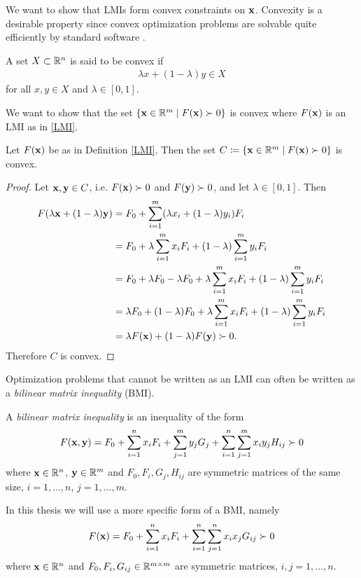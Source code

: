 \documentclass[a4paper,12pt,twoside,BCOR=10mm]{scrbook}
\begin{document}
We want to show that LMIs form convex constraints on $\mathbf{x}$. Convexity is a desirable property since convex optimization problems are solvable quite efficiently by standard software \citep{vABr2000lmibmi}.
\begin{definition}\label{Kýptni}
A set $X \subset \mathbb{R}^{n}$ is said to be convex if
    \begin{align*}
        \lambda x + (1 - \lambda)y \in X
    \end{align*}
for all $x,y\in X$ and $\lambda \in [0,1]$.
\end{definition}
We want to show that the set $\{\mathbf{x}\in\mathbb{R}^{m} \mid F(\mathbf{x}) \succ 0\}$ is convex where $F(\mathbf{x})$ is an LMI as in \eqref{LMI}.
\begin{theorem}\label{KýptniLMI}
Let $F(\mathbf{x})$ be as in Definition \ref{LMI}. Then the set $C \coloneqq \{\mathbf{x}\in\mathbb{R}^{m} \mid F(\mathbf{x}) \succ 0\}$ is convex.
\end{theorem}
\begin{proof}
Let $\mathbf{x}, \mathbf{y} \in C$, i.e. $F(\mathbf{x}) \succ 0$ and $F(\mathbf{y}) \succ 0$, and let $\lambda \in [0,1]$. Then
\begin{align*}
    F(\lambda\mathbf{x} + (1 - \lambda)\mathbf{y}) &= F_0 + \sum\limits_{i = 1}^m (\lambda x_i + (1 - \lambda)y_i)F_i\\
    &= F_0 + \lambda \sum\limits_{i = 1}^m x_i F_i + (1 - \lambda)\sum\limits_{i = 1}^m y_i F_i\\
    &= F_0 + \lambda F_0 - \lambda F_0 + \lambda \sum\limits_{i = 1}^m x_i F_i + (1 - \lambda)\sum\limits_{i = 1}^m y_i F_i\\
    &= \lambda F_0 + (1 - \lambda) F_0 + \lambda \sum\limits_{i = 1}^m x_i F_i + (1 - \lambda)\sum\limits_{i = 1}^m y_i F_i\\
    &= \lambda F(\mathbf{x}) + (1 - \lambda)F(\mathbf{y}) \succ 0.
\end{align*}
Therefore $C$ is convex.
\end{proof}

Optimization problems that cannot be written as an LMI can often be written as a \textit{bilinear matrix inequality} (BMI).

\begin{definition}\label{BMIDefinitionGeneral}
A \textit{bilinear matrix inequality} is an inequality of the form
    \begin{align}
        F(\mathbf{x}, \mathbf{y}) = F_0 + \sum_{i = 1}^nx_iF_i + \sum_{j = 1}^m y_jG_j + \sum_{i = 1}^n \sum_{j = 1}^m x_iy_j H_{ij} \succ 0
    \end{align}
where $\mathbf{x}\in \mathbb{R}^{n}$, $\mathbf{y}\in \mathbb{R}^{m}$ and $F_0, F_i, G_j, H_{ij}$ are symmetric matrices of the same size, $i = 1, \ldots, n$, $j = 1, \ldots, m$.
\end{definition}
In this thesis we will use a more specific form of a BMI, namely
\begin{align}\label{BMIDefinition}
    F(\mathbf{x}) = F_0 + \sum_{i = 1}^n x_i F_i + \sum_{i = 1}^n \sum_{j = 1}^n x_ix_j G_{ij} \succ 0
\end{align}
where $\mathbf{x} \in \mathbb{R}^{n}$ and $F_0, F_i, G_{ij} \in \mathbb{R}^{m \times m}$ are symmetric matrices, $i,j = 1, \ldots, n$.
\end{document}
